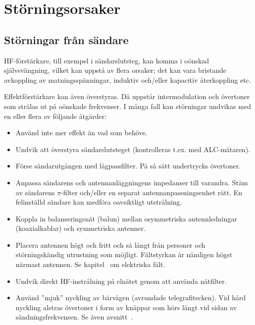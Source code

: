 \section{Störningsorsaker}
\label{sec:storningsorsaker}

\subsection{Störningar från sändare}

HF-förstärkare, till exempel i sändarslutsteg,
kan komma i oönskad självsvängning,
vilket kan uppstå av flera orsaker; det kan vara bristande avkoppling av
matningsspänningar, induktiv och/eller kapacitiv återkoppling etc.

Effektförstärkare kan även överstyras.
Då uppstår intermodulation och övertoner som strålas ut på oönskade frekvenser.
I många fall kan störningar undvikas med en eller flera av följande åtgärder:

\begin{itemize}
\item Använd inte mer effekt än vad som behövs.
\item Undvik att överstyra sändarslutsteget (kontrolleras t.ex. med
  ALC-mätaren).
\item Förse sändarutgången med lågpassfilter.
  På så sätt undertrycks övertoner.
\item Anpassa sändarens och antennanläggningens impedanser till varandra.
  Stäm av sändarens \(\pi\)-filter och/eller en separat antennanpassningsenhet
  rätt.
  En felinställd sändare kan medföra oavsiktligt utstrålning.
\item Koppla in balanseringsnät (balun) mellan osymmetriska antennledningar
  (koaxialkablar) och symmetriska antenner.
\item Placera antennen högt och fritt och så långt från personer och
  störningskänslig utrustning som möjligt.
  Fältstyrkan är nämligen högst närmast antennen.
  Se kapitel~ om elektriska fält.
\item Undvik direkt HF-instrålning på elnätet genom att använda nätfilter.
\item Använd ''mjuk'' nyckling av bärvågen (avrundade telegrafitecken).
  Vid hård nyckling alstras övertoner i form av knäppar som hörs långt vid
  sidan av sändningsfrekvensen. Se även avsnitt~.
\end{itemize}

